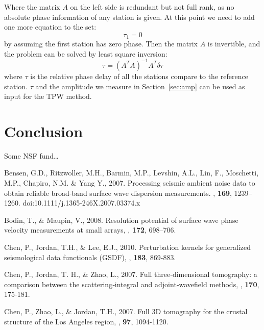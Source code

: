 \documentclass[referee]{gji}
\begin{document}
{{Where the matrix $A$ on the left side is redundant but not full rank, as no absolute phase information of any station is given. At this point we need to add one more equation to the set:
\[
\tau_1 = 0
\]
by assuming the first station has zero phase. Then the matrix $A$ is invertible, and the problem can be solved by least square inversion:
\[
\tau = (A^TA)^{-1}A^T \delta\tau
\]
where $\tau$ is the relative phase delay of all the stations compare to the reference station. $\tau$ and the amplitude we measure in Section~\ref{sec:amp} can be used as input for the TPW method.

\section{Conclusion}

\begin{acknowledgments}
	Some NSF fund\ldots 
\end{acknowledgments}

\begin{thebibliography}{}

	   Bensen, G.D., Ritzwoller, M.H., Barmin, M.P., Levshin, A.L., Lin, F., Moschetti, M.P., Chapiro, N.M. \& Yang Y., 2007. Processing seismic ambient noise data to obtain reliable broad‐band surface wave dispersion measurements. \textit{\gjras}, \textbf{169}, 1239–1260. doi:10.1111/j.1365-246X.2007.03374.x

	   Bodin, T., \& Maupin, V., 2008. Resolution potential of surface wave phase velocity measurements at small arrays, \textit{\gji}, \textbf{172}, 698–706.

	   Chen, P., Jordan, T.H., \& Lee, E.J., 2010. Perturbation kernels for generalized seismological data functionals (GSDF), \textit{\gji}, \textbf{183}, 869-883.

	   Chen, P., Jordan, T. H., \& Zhao, L., 2007. Full three‐dimensional tomography: a comparison between the scattering‐integral and adjoint‐wavefield methods, \textit{\gji}, \textbf{170}, 175-181.

	   Chen, P., Zhao, L., \& Jordan, T.H., 2007. Full 3D tomography for the crustal structure of the Los Angeles region, \textit{\bssa}, \textbf{97}, 1094-1120.


\end{thebibliography}}}
\end{document}
